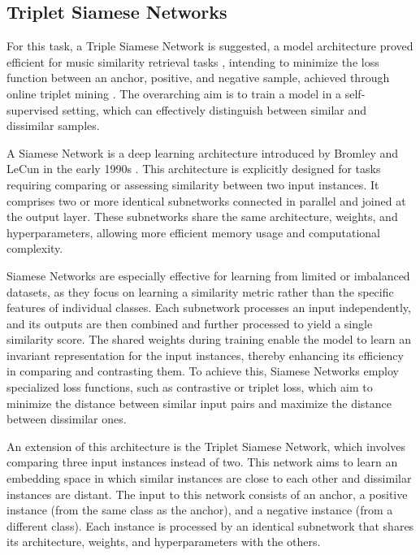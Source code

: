 \subsection{Triplet Siamese Networks}

For this task, a Triple Siamese Network is suggested, a model architecture proved efficient for music similarity retrieval tasks \cite{contentmusicsimtriplet2020}, intending to minimize the loss function between an anchor, positive, and negative sample, achieved through online triplet mining \cite{Sikaroudi2020OfflinePatches}. The overarching aim is to train a model in a self-supervised setting, which can effectively distinguish between similar and dissimilar samples. 

A Siamese Network is a deep learning architecture introduced by Bromley and LeCun in the early 1990s \cite{Bromley1993SignatureNetwork}. This architecture is explicitly designed for tasks requiring comparing or assessing similarity between two input instances. It comprises two or more identical subnetworks connected in parallel and joined at the output layer. These subnetworks share the same architecture, weights, and hyperparameters, allowing more efficient memory usage and computational complexity.

Siamese Networks are especially effective for learning from limited or imbalanced datasets, as they focus on learning a similarity metric rather than the specific features of individual classes. Each subnetwork processes an input independently, and its outputs are then combined and further processed to yield a single similarity score. The shared weights during training enable the model to learn an invariant representation for the input instances, thereby enhancing its efficiency in comparing and contrasting them. To achieve this, Siamese Networks employ specialized loss functions, such as contrastive or triplet loss, which aim to minimize the distance between similar input pairs and maximize the distance between dissimilar ones.

An extension of this architecture is the Triplet Siamese Network, which involves comparing three input instances instead of two. This network aims to learn an embedding space in which similar instances are close to each other and dissimilar instances are distant. The input to this network consists of an anchor, a positive instance (from the same class as the anchor), and a negative instance (from a different class). Each instance is processed by an identical subnetwork that shares its architecture, weights, and hyperparameters with the others.

